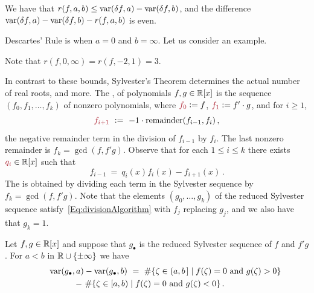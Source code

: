 \begin{theorem}
  We have that $r(f,a,b)\leq \operatorname{{\rm var}}(\delta f,a) -\operatorname{{\rm var}}(\delta f,b)$, and the difference
  $\operatorname{{\rm var}}(\delta f,a) -\operatorname{{\rm var}}(\delta f,b)-r(f,a,b)$ is even. 
\end{theorem}

Descartes' Rule is when $a=0$ and $b=\infty$.
Let us consider an example.
%
\begin{leftbar}

\end{leftbar}
%
Note that $r(f,0,\infty)=r(f,-2,1)=3$.

In contrast to these bounds, 
Sylvester's Theorem determines the actual number of real roots, and more.
The ,  of polynomials $f,g\in\mathbb{R}[x]$ is the sequence
$\left(f_0,f_1,\dotsc,f_k\right)$ of nonzero polynomials, where $\defcolor{f_0}\vcentcolon= f$, $\defcolor{f_1}\vcentcolon= f'\cdot g$,
and for $i\geq 1$, 
%
  \[
    \defcolor{f_{i+1}}\ \vcentcolon=\ -1\cdot \mbox{remainder}(f_{i-1},f_i)\,,
  \]
%
the negative remainder term in the division of $f_{i-1}$ by $f_i$.
The last nonzero remainder is $f_k = \gcd(f,f'g)$.
Observe that for each $1\leq i\leq k$ there exists $\defcolor{q_i}\in\RR[x]$ such that
%
 \begin{equation}\label{Eq:divisionAlgorithm}
    f_{i-1}\ =\ q_i(x)f_i(x)-f_{i+1}(x)\,.
 \end{equation}
%
The  is obtained by dividing each term in the Sylvester sequence by $f_k=\gcd(f,f'g)$.
Note that the elements $(g_0,\dotsc,g_k)$ of the reduced Sylvester sequence satisfy~\eqref{Eq:divisionAlgorithm} with $f_j$ replacing $g_j$,
and we also have that $g_k=1$.

\begin{theorem}[Sylvester]
  \label{Th:Sylvester}
  Let $f,g\in\mathbb{R}[x]$ and suppose that $g_\bullet$ is the reduced Sylvester sequence of $f$ and $f'g$.
  For $a<b$ in $\mathbb{R}\cup\{\pm\infty\}$ we have
  \begin{multline*}
    \qquad\operatorname{{\rm var}}(g_\bullet,a)-\operatorname{{\rm var}}(g_\bullet,b)\ =\
    \#\{\zeta\in(a,b\hspace{.05cm}]\mid f(\zeta)=0\mbox{ and } g(\zeta)>0\}\\
      \ -\
    \#\{\zeta\in[a,b)\mid f(\zeta)=0\mbox{ and } g(\zeta)<0\}\,.\qquad
  \end{multline*}
\end{theorem}

